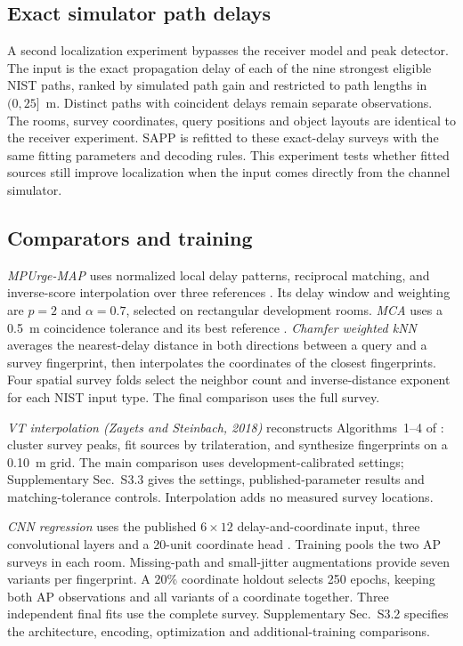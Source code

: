 \documentclass[conference]{IEEEtran}
\begin{document}
\subsection{Exact simulator path delays}
\label{sec:rawsetup}
A second localization experiment bypasses the receiver model and peak detector. The input is the exact propagation delay of each of the nine strongest eligible NIST paths, ranked by simulated path gain and restricted to path lengths in $(0,25]$~m. Distinct paths with coincident delays remain separate observations. The rooms, survey coordinates, query positions and object layouts are identical to the receiver experiment. SAPP is refitted to these exact-delay surveys with the same fitting parameters and decoding rules. This experiment tests whether fitted sources still improve localization when the input comes directly from the channel simulator.

\subsection{Comparators and training}
\emph{MPUrge-MAP} uses normalized local delay patterns, reciprocal matching, and inverse-score interpolation over three references \cite{abdmoulah2026mpurgemap}. Its delay window and weighting are \(p=2\) and \(\alpha=0.7\), selected on rectangular development rooms. \emph{MCA} uses a 0.5~m coincidence tolerance and its best reference \cite{zayets2017mca}. \emph{Chamfer weighted kNN} averages the nearest-delay distance in both directions between a query and a survey fingerprint, then interpolates the coordinates of the closest fingerprints. Four spatial survey folds select the neighbor count and inverse-distance exponent for each NIST input type. The final comparison uses the full survey.

\emph{VT interpolation (Zayets and Steinbach, 2018)} reconstructs Algorithms~1--4 of \cite{zayets2018interpolation}: cluster survey peaks, fit sources by trilateration, and synthesize fingerprints on a 0.10~m grid. The main comparison uses development-calibrated settings; Supplementary Sec.~S3.3 gives the settings, published-parameter results and matching-tolerance controls. Interpolation adds no measured survey locations.

\emph{CNN regression} uses the published $6\times12$ delay-and-coordinate input, three convolutional layers and a 20-unit coordinate head \cite{abdmoulah2026cnn}. Training pools the two AP surveys in each room. Missing-path and small-jitter augmentations provide seven variants per fingerprint. A 20\% coordinate holdout selects 250 epochs, keeping both AP observations and all variants of a coordinate together. Three independent final fits use the complete survey. Supplementary Sec.~S3.2 specifies the architecture, encoding, optimization and additional-training comparisons.
\end{document}
